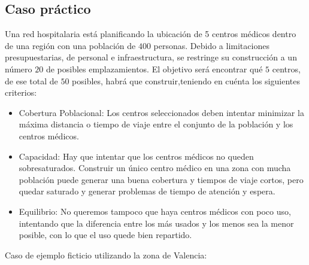 \documentclass[12pt,a4paper]{book}
\begin{document}
\subsection{Caso práctico}
Una red hospitalaria está planificando la ubicación de 5 centros médicos dentro de una región con una población de $400$ personas. Debido a limitaciones presupuestarias, de personal e infraestructura, se restringe su construcción a un número $20$ de posibles emplazamientos. El objetivo será encontrar qué $5$ centros, de ese total de $50$ posibles, habrá que construir,teniendo en cuénta los siguientes criterios:

\begin{itemize}
    \item Cobertura Poblacional: Los centros seleccionados deben intentar minimizar la máxima distancia o tiempo de viaje entre el conjunto de la población y los centros médicos.
    \item Capacidad: Hay que intentar que los centros médicos no queden sobresaturados. Construir un único centro médico en una zona con mucha población puede generar una buena cobertura y tiempos de viaje cortos, pero quedar saturado y generar problemas de tiempo de atención y espera.
    \item Equilibrio: No queremos tampoco que haya centros médicos con poco uso, intentando que la diferencia entre los más usados y los menos sea la menor posible, con lo que el uso quede bien repartido.
\end{itemize}
Caso de ejemplo ficticio utilizando la zona de Valencia:
\end{document}
